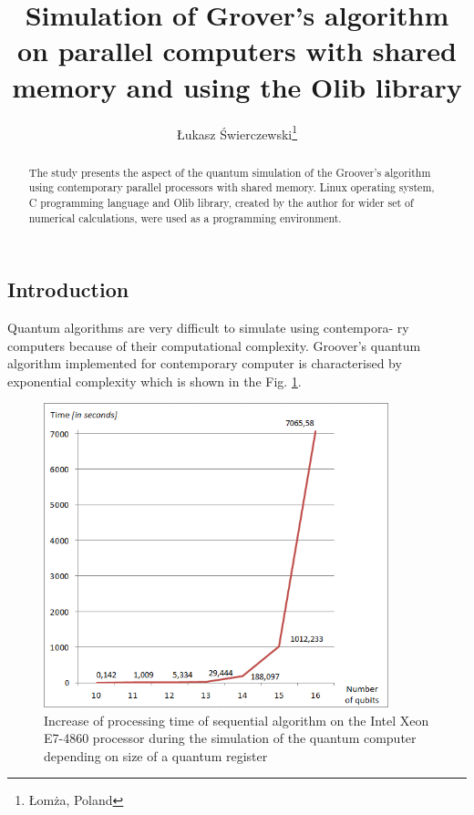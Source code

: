 \documentclass[10pt, a5paper]{article}
\begin{document}
\title{Simulation of Grover's algorithm on parallel computers with shared memory and using the Olib library}%

\author{\L{}ukasz \'{S}wierczewski\footnote{\L{}om\.z{}a, Poland}}
\maketitle

\begin{abstract}
The study presents the aspect of the quantum simulation of the Groover's algorithm using contemporary parallel processors with shared memory. Linux operating system, C programming language and Olib library, created by the author for wider set of numerical calculations, were used as a programming environment.
\end{abstract}


\subsection*{Introduction}

Quantum algorithms are very difficult to simulate using contempora- ry computers because of their computational complexity. Groover's quantum algorithm implemented for contemporary computer is \linebreak characterised by exponential complexity which is shown in the Fig. \ref{fig:lf1}.

\begin{figure}
  \centering
  \includegraphics[width=10cm]{18_2012_1.png}
  \caption{Increase of processing time of sequential algorithm on the Intel Xeon E7-4860  processor during the simulation of the quantum computer depending on size of a quantum register}
  \label{fig:lf1}
\end{figure}
\end{document}
